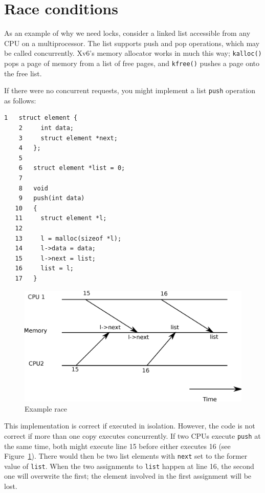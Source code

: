 \section{Race conditions}

As an example of why we need locks,
consider a linked list accessible from any
CPU on a multiprocessor.
The list supports push and pop operations, which
may be called concurrently.
Xv6's memory allocator works in much this way;
\lstinline{kalloc()}
pops a page of memory from a list of free pages,
and
\lstinline{kfree()}
pushes a page onto the free list.

If there were no
concurrent requests, you might implement a list
\lstinline{push}
operation as follows:
\begin{lstlisting}[]
    1	struct element {
    2	  int data;
    3	  struct element *next;
    4	};
    5	
    6	struct element *list = 0;
    7	
    8	void
    9	push(int data)
   10	{
   11	  struct element *l;
   12	
   13	  l = malloc(sizeof *l);
   14	  l->data = data;
   15	  l->next = list;
   16	  list = l;
   17	}
\end{lstlisting}

\begin{figure}[t]
\center
\includegraphics[scale=0.5]{fig/race.eps}
\caption{Example race}
\label{fig:race}
\end{figure}
This implementation is correct if executed in isolation.
However, the code is not correct if more than one
copy executes concurrently.
If two CPUs execute
\lstinline{push}
at the same time,
both might execute line 15
before either executes 16 (see 
Figure~\ref{fig:race}).
There would then be two
list elements with
\lstinline{next}
set to the former value of
\lstinline{list}.
When the two assignments to
\lstinline{list}
happen at line 16,
the second one will overwrite the first;
the element involved in the first assignment
will be lost.

